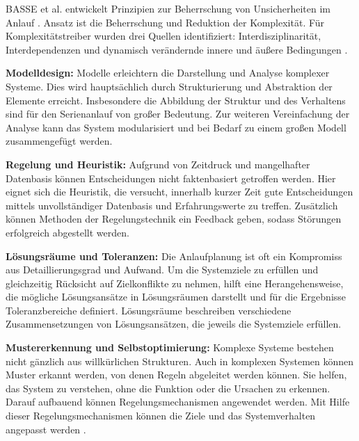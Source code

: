 BASSE et al. entwickelt Prinzipien zur Beherrschung von Unsicherheiten im Anlauf \cite{Basse2014a}. Ansatz ist die Beherrschung und Reduktion der Komplexität. Für Komplexitätstreiber wurden drei Quellen identifiziert: Interdisziplinarität, Interdependenzen und dynamisch verändernde innere und äußere Bedingungen \cite{Basse2014a, Gartzen2012, Schuh2008}. 

\textbf{Modelldesign:} Modelle erleichtern die Darstellung und Analyse komplexer Systeme. Dies wird hauptsächlich durch Strukturierung und Abstraktion der Elemente erreicht. 
Insbesondere die Abbildung der Struktur und des Verhaltens sind für den Serienanlauf von großer Bedeutung. Zur weiteren Vereinfachung der Analyse kann das System modularisiert und bei Bedarf zu einem großen Modell zusammengefügt werden. 

\textbf{Regelung und Heuristik:} Aufgrund von Zeitdruck und mangelhafter Datenbasis können Entscheidungen nicht faktenbasiert getroffen werden. Hier eignet sich die Heuristik, die versucht, innerhalb kurzer Zeit gute Entscheidungen mittels unvollständiger Datenbasis und Erfahrungswerte zu treffen. Zusätzlich können Methoden der Regelungstechnik ein Feedback geben, sodass Störungen erfolgreich abgestellt werden.

\textbf{Lösungsräume und Toleranzen:}
Die Anlaufplanung ist oft ein Kompromiss aus Detaillierungsgrad und Aufwand. Um die Systemziele zu erfüllen und gleichzeitig Rücksicht auf Zielkonflikte zu nehmen, hilft eine Herangehensweise, die mögliche Lösungsansätze in Lösungsräumen darstellt und für die Ergebnisse Toleranzbereiche definiert. Lösungsräume beschreiben verschiedene Zusammensetzungen von Lösungsansätzen, die jeweils die Systemziele erfüllen. 

\textbf{Mustererkennung und Selbstoptimierung:}
Komplexe Systeme bestehen nicht gänzlich aus willkürlichen Strukturen. Auch in komplexen Systemen können Muster erkannt werden, von denen Regeln abgeleitet werden können. Sie helfen, das System zu verstehen, ohne die Funktion oder die Ursachen zu erkennen. Darauf aufbauend können Regelungsmechanismen angewendet werden. Mit Hilfe dieser Regelungsmechanismen können die Ziele und das Systemverhalten angepasst werden \cite{Frank2009}. 

